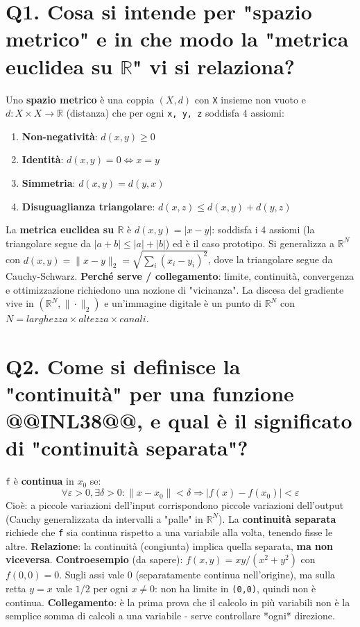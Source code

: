 \documentclass[11pt,a4paper]{article}
\begin{document}
\section*{Q1. Cosa si intende per "spazio metrico" e in che modo la "metrica euclidea su $\mathbb{R}$" vi si relaziona?}
Uno \textbf{spazio metrico} è una coppia $(X, d)$ con \texttt{X} insieme non vuoto e $d: X \times  X \to  \mathbb{R}$ (distanza) che per ogni \texttt{x, y, z} soddisfa 4 assiomi:
\begin{enumerate}
\item \textbf{Non-negatività}: $d(x,y) \ge  0$
\item \textbf{Identità}: $d(x,y) = 0 \Leftrightarrow  x = y$
\item \textbf{Simmetria}: $d(x,y) = d(y,x)$
\item \textbf{Disuguaglianza triangolare}: $d(x,z) \le  d(x,y) + d(y,z)$
\end{enumerate}
La \textbf{metrica euclidea su $\mathbb{R}$} è $d(x,y) = |x - y|$: soddisfa i 4 assiomi (la triangolare segue da $|a+b| \le  |a|+|b|$) ed è il caso prototipo. Si generalizza a $\mathbb{R}^{N}$ con $d(x,y) = \|x - y\|_{2} = \sqrt{\sum _{i}(x_{i} - y_{i})^{2}}$, dove la triangolare segue da Cauchy-Schwarz.
\textbf{Perché serve / collegamento}: limite, continuità, convergenza e ottimizzazione richiedono una nozione di "vicinanza". La discesa del gradiente vive in $(\mathbb{R}^{N}, \|\cdot \|_{2})$ e un'immagine digitale è un punto di $\mathbb{R}^{N}$ con $N = larghezza \times  altezza \times  canali$.
\newpage
\section*{Q2. Come si definisce la "continuità" per una funzione @@INL38@@, e qual è il significato di "continuità separata"?}
\texttt{f} è \textbf{continua} in $x_{0}$ se:
\[ \forall \varepsilon  > 0, \exists \delta  > 0 : \|x - x_{0}\| < \delta  \Rightarrow  |f(x) - f(x_{0})| < \varepsilon  \]
Cioè: a piccole variazioni dell'input corrispondono piccole variazioni dell'output (Cauchy generalizzata da intervalli a "palle" in $\mathbb{R}^{N}$).
La \textbf{continuità separata} richiede che \texttt{f} sia continua rispetto a una variabile alla volta, tenendo fisse le altre.
\textbf{Relazione}: la continuità (congiunta) implica quella separata, \textbf{ma non viceversa}.
\textbf{Controesempio} (da sapere): $f(x,y) = xy/(x^{2}+y^{2})$ con $f(0,0)=0$. Sugli assi vale 0 (separatamente continua nell'origine), ma sulla retta $y=x$ vale $1/2$ per ogni $x\ne 0$: non ha limite in \texttt{(0,0)}, quindi non è continua.
\textbf{Collegamento}: è la prima prova che il calcolo in più variabili non è la semplice somma di calcoli a una variabile - serve controllare *ogni* direzione.
\newpage
\end{document}
